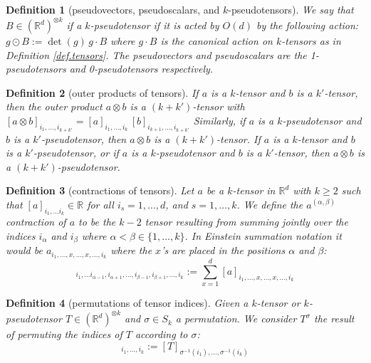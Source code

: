 \documentclass{article}
\theoremstyle{plain}
\newtheorem{definition}{Definition}
\begin{document}
\begin{definition}[pseudovectors, pseudoscalars, and $k$-pseudotensors]
We say that $B\in (\mathbb R^d)^{\otimes k}$ if a $k$-pseudotensor if it is acted by $O(d)$ by the following action: $g\odot B := \det(g)\, g \cdot B$ where $g\cdot B$ is the canonical action on $k$-tensors as in Definition \ref{def.tensors}. The pseudovectors and pseudoscalars are the 1-pseudotensors and 0-pseudotensors respectively.
\end{definition}

\begin{definition}[outer products of tensors]
If $a$ is a $k$-tensor and $b$ is a $k'$-tensor, then the outer product $a\otimes b$ is a $(k+k')$-tensor with $[a\otimes b]_{i_1,\ldots,i_{k+k'}} = [a]_{i_1,\ldots,i_k}\,[b]_{i_{k+1},\ldots,i_{k+k'}}$
Similarly, if $a$ is a $k$-pseudotensor and $b$ is a $k'$-pseudotensor, then $a\otimes b$ is a $(k+k')$-tensor.
If $a$ is a $k$-tensor and $b$ is a $k'$-pseudotensor, or if $a$ is a $k$-pseudotensor and $b$ is a $k'$-tensor, then $a\otimes b$ is a $(k+k')$-pseudotensor.
\end{definition}

\begin{definition}[contractions of tensors]
Let $a$ be a $k$-tensor in $\mathbb R^d$ with $k\geq 2$ such that $[a]_{i_1,\ldots i_k}\in \mathbb R$ for all $i_s = 1,\ldots, d$, and $s=1,\ldots, k$. We define the $a^{(\alpha,\beta)}$ contraction of $a$ to be the $k-2$ tensor resulting from summing jointly over the indices $i_\alpha$ and $i_\beta$ where $\alpha < \beta \in\{1,\ldots, k\}$. In Einstein summation notation it would be $a_{i_1, \ldots, x, \ldots , x, \ldots, i_k}$ where the $x$'s are placed in the positions $\alpha$ and $\beta$:
\begin{equation}
[a^{(\alpha,\beta)}]_{i_1,\ldots i_{\alpha-1}, i_{\alpha+1}, \ldots, i_{\beta-1}, i_{\beta+1} , \ldots, i_k} := \sum_{x=1}^d [a]_{i_1, \ldots, x, \ldots , x, \ldots, i_k}
\end{equation}
\end{definition}

\begin{definition}[permutations of tensor indices]
Given a $k$-tensor or $k$-pseudotensor $T\in (\mathbb R^d)^{\otimes k}$ and $\sigma\in S_k$ a permutation. We consider $T^\sigma$ the result of permuting the indices of $T$ according to $\sigma$:
\begin{equation}
    [T^\sigma]_{i_1, \ldots, i_k} := [T]_{\sigma^{-1}(i_1), \ldots, \sigma^{-1}(i_k)}
\end{equation}
\end{definition}
\end{document}
